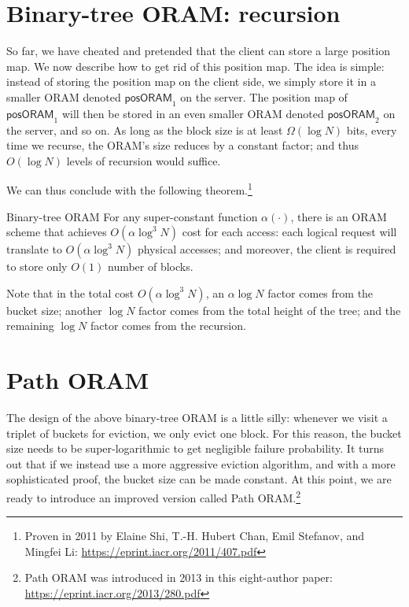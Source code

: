 \section{Binary-tree ORAM: recursion}\label{binary-tree-oram-recursion}

So far, we have cheated and pretended that the client can store a large
position map. We now describe how to get rid of this position map. The
idea is simple: instead of storing the position map on the client side,
we simply store it in a smaller ORAM denoted
$\textsf{posORAM}_{1}$ on the server. The position map of
$\textsf{posORAM}_{1}$ will then be stored in an even smaller
ORAM denoted $\textsf{posORAM}_{2}$ on the server, and so on.
As long as the block size is at least $\Omega( \log N )$
bits, every time we recurse, the ORAM's size reduces by a constant
factor; and thus $O( \log N )$ levels of recursion would
suffice.

We can thus conclude with the following theorem.\footnote{Proven in 2011 by Elaine Shi, T.-H. Hubert Chan, Emil Stefanov, and Mingfei Li: \url{https://eprint.iacr.org/2011/407.pdf}}

\begin{theorem}{Binary-tree ORAM}{}
  For any super-constant function $\alpha( \cdot )$, there is an ORAM scheme
  that achieves $O( \alpha\log^{3}N )$ cost for each access:
  each logical request will translate to
  $O( \alpha\log^{3}N )$ physical accesses; and moreover, the
  client is required to store only $O(1)$ number of blocks.
\end{theorem}

Note that in the total cost $O( \alpha\log^{3}N )$, an
$\alpha\log N$ factor comes from the bucket size; another $\log N$
factor comes from the total height of the tree; and the remaining
$\log N$ factor comes from the recursion.

\section{Path ORAM}\label{path-oram}

The design of the above binary-tree ORAM is a little silly: whenever we
visit a triplet of buckets for eviction, we only evict one block. For
this reason, the bucket size needs to be super-logarithmic to get
negligible failure probability. It turns out that if we instead use a
more aggressive eviction algorithm, and with a more sophisticated proof,
the bucket size can be made constant. At this point, we are ready to
introduce an improved version called \alert{Path
ORAM}.\footnote{Path ORAM was introduced in 2013 in this eight-author paper: \url{https://eprint.iacr.org/2013/280.pdf}}

